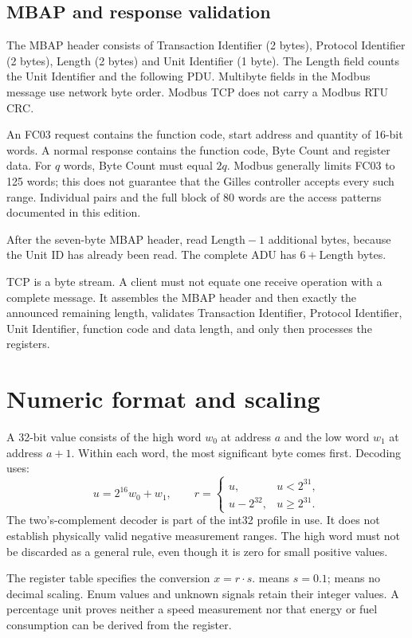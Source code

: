 \documentclass[10pt,a4paper]{article}
\begin{document}
\subsection{MBAP and response validation}
The MBAP header consists of Transaction Identifier (2 bytes), Protocol Identifier (2 bytes), Length (2 bytes) and Unit Identifier (1 byte). The Length field counts the Unit Identifier and the following PDU. Multibyte fields in the Modbus message use network byte order. Modbus TCP does not carry a Modbus RTU CRC.

An FC03 request contains the function code, start address and quantity of 16-bit words. A normal response contains the function code, Byte Count and register data. For $q$ words, Byte Count must equal $2q$. Modbus generally limits FC03 to 125 words; this does not guarantee that the Gilles controller accepts every such range. Individual pairs and the full block of 80 words are the access patterns documented in this edition.

After the seven-byte MBAP header, read $\mathrm{Length}-1$ additional bytes, because the Unit ID has already been read. The complete ADU has $6+\mathrm{Length}$ bytes.

TCP is a byte stream. A client must not equate one receive operation with a complete message. It assembles the MBAP header and then exactly the announced remaining length, validates Transaction Identifier, Protocol Identifier, Unit Identifier, function code and data length, and only then processes the registers.

\section{Numeric format and scaling}
\label{sec:format}
A 32-bit value consists of the high word $w_0$ at address $a$ and the low word $w_1$ at address $a+1$. Within each word, the most significant byte comes first. Decoding uses:
\[
 u=2^{16}w_0+w_1,\qquad
 r=\begin{cases}u,&u<2^{31},\\u-2^{32},&u\geq2^{31}.\end{cases}
\]
The two's-complement decoder is part of the int32 profile in use. It does not establish physically valid negative measurement ranges. The high word must not be discarded as a general rule, even though it is zero for small positive values.

The register table specifies the conversion $x=r\cdot s$.  means $s=0.1$;  means no decimal scaling. Enum values and unknown signals retain their integer values. A percentage unit proves neither a speed measurement nor that energy or fuel consumption can be derived from the register.
\end{document}
